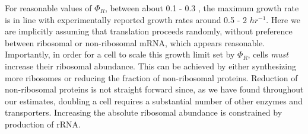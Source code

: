 For reasonable values of $\Phi_R$, between about 0.1 - 0.3 \citep{scott2010},
the maximum growth rate is in line with experimentally reported growth rates
around 0.5 - 2 $hr^{-1}$. Here we are implicitly assuming that translation
proceeds randomly, without preference between ribosomal or non-ribosomal mRNA,
which appears reasonable. Importantly, in order for a cell to scale this growth
limit set by $\Phi_R$, cells \textit{must} increase their ribosomal abundance.
This can be achieved by either synthesizing more ribosomes or reducing the
fraction of non-ribosomal proteins. Reduction of non-ribosomal proteins is not
straight forward since, as we have found throughout our estimates, doubling a
cell requires a substantial number of other enzymes and transporters. Increasing
the absolute ribosomal abundance is constrained by production of rRNA.

